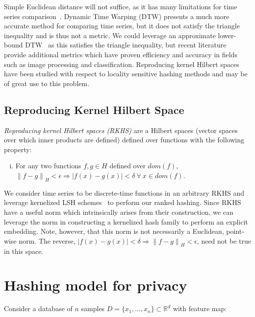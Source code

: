 \documentclass[a4paper]{article}
\newcommand{\norm}[1]{\left\lVert#1\right\rVert}
\begin{document}

Simple Euclidean distance will not suffice, as it has many limitations for time series comparison~\cite{weighted-dtw}.
Dynamic Time Warping (DTW) presents a much more accurate method for comparing time series, but it does not satisfy the triangle inequality and is thus not a metric.
We could leverage an approximate lower-bound DTW~\cite{Lemire09-DTW} as this satisfies the triangle inequality, but recent literature~\cite{Kulis12-KLSH,Jiang15-KLSH,Kim16-SLSH} provide additional metrics which have proven efficiency and accuracy in fields such as image processing and classification.
Reproducing kernel Hilbert spaces have been studied with respect to locality sensitive hashing methods and may be of great use to this problem.

\subsection{Reproducing Kernel Hilbert Space}

\textit{Reproducing kernel Hilbert spaces (RKHS)} are a Hilbert spaces (vector spaces over which inner products are defined) defined over functions with the following property:
\begin{enumerate}[(i)]
    \item For any two functions $f,g \in H$ defined over $dom(f)$, $\norm{f-g}_{H} < \epsilon \Rightarrow |f(x)-g(x)| < \delta~\forall~x \in dom(f)$. 
\end{enumerate}

We consider time series to be discrete-time functions in an arbitrary RKHS and leverage kernelized LSH schemes~\cite{Kale14-KLSH,Jiang15-KLSH, Kulis12-KLSH} to perform our ranked hashing.
Since RKHS have a useful norm which intrinsically arises from their construction, we can leverage the norm in constructing a kernelized hash family to perform an explicit embedding.
Note, however, that this norm is not necessarily a Euclidean, point-wise norm.
The reverse, $|f(x)-g(x)| < \delta \Rightarrow \norm{f-g}_{H} < \epsilon$, need not be true in this space.

\section{Hashing model for privacy}

Consider a database of $n$ samples $D = \{x_1,\ldots,x_n\} \subset \mathbb{R}^d$ with feature map:
\end{document}
